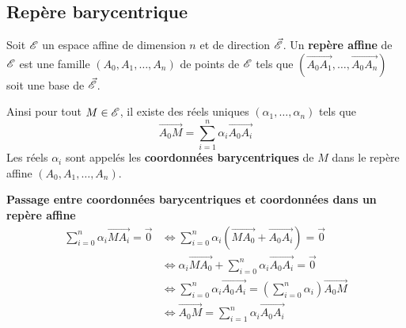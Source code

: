 \documentclass[a4paper, 12pt]{article}
\begin{document}
\subsection{Repère barycentrique}

\begin{definition}
    Soit $\mathscr{E}$ un espace affine de dimension $n$ et de direction $\vec{\mathscr{E}}$. Un \textbf{repère affine} de $\mathscr{E}$ est une famille $(A_0, A_1, \ldots, A_n)$ de points de $\mathscr{E}$ tels que
    $(\overrightarrow{A_0 A_1}, \ldots, \overrightarrow{A_0 A_n})$ soit une base de $\vec{\mathscr{E}}$.

    Ainsi pour tout $M \in \mathscr{E}$, il existe des réels uniques $(\alpha_1, \ldots, \alpha_n)$ tels que
    $$
    \overrightarrow{A_0 M} = \sum_{i=1}^n \alpha_i \overrightarrow{A_0 A_i}
    $$
    Les réels $\alpha_i$ sont appelés les \textbf{coordonnées barycentriques} de $M$ dans le repère affine $(A_0, A_1, \ldots, A_n)$.
\end{definition}

\begin{methode}
    \textbf{Passage entre coordonnées barycentriques et coordonnées dans un repère affine}
    \begin{align*}
        \sum_{i=0}^n \alpha_i \overrightarrow{M A_i} = \vec{0} &\iff \sum_{i=0}^n \alpha_i (\overrightarrow{MA_0} + \overrightarrow{A_0 A_i}) = \vec{0} \\
        &\iff \alpha_i \overrightarrow{M A_0} + \sum_{i=0}^n \alpha_i \overrightarrow{A_0 A_i} = \vec{0} \\
        &\iff \sum_{i=0}^n \alpha_i \overrightarrow{A_0 A_i} = (\sum_{i=0}^n \alpha_i) \overrightarrow{A_0 M} \\
        &\iff \overrightarrow{A_0 M} = \sum_{i=1}^n \alpha_i \overrightarrow{A_0 A_i}
    \end{align*}
\end{methode}
\end{document}
